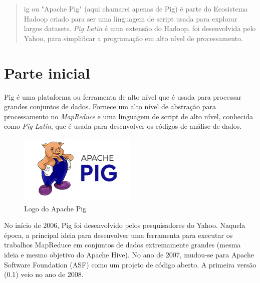 \documentclass[a4paper,11pt]{article}
\begin{document}
	
	\maketitle %
	\thispagestyle{fancy} %
	
\begin{abstract}
	ig\cite{pigoficial} ou "Apache Pig" (aqui chamarei apenas de Pig) é parte do Ecosistema Hadoop criado para ser uma linguagem de script usada para explorar largos datasets. \textit{Pig Latin} é uma extensão do Hadoop, foi desenvolvida pelo Yahoo, para simplificar a programação em alto nível de processamento.
\end{abstract}

\section{Parte inicial}
Pig é uma plataforma ou ferramenta de alto nível que é usada para processar grandes conjuntos de dados. Fornece um alto nível de abstração para processamento no \textit{MapReduce} e uma linguagem de script de alto nível, conhecida como \textit{Pig Latin}, que é usada para desenvolver os códigos de análise de dados.
\begin{figure}[H]
	\centering
	\includegraphics[width=0.5\textwidth]{imagem/logo}
	\caption{Logo do Apache Pig}
\end{figure}

No início de 2006, Pig foi desenvolvido pelos pesquisadores do Yahoo. Naquela época, a principal ideia para desenvolver uma ferramenta para executar os trabalhos MapReduce em conjuntos de dados extremamente grandes (mesma ideia e mesmo objetivo do Apache Hive). No ano de 2007, mudou-se para Apache Software Foundation (ASF) como um projeto de código aberto. A primeira versão (0.1) veio no ano de 2008.
\end{document}
